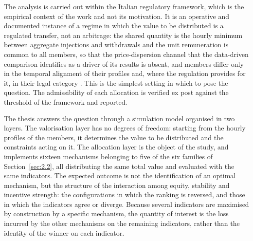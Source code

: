 The analysis is carried out within the Italian regulatory framework, which is the empirical context of the work and not its motivation. It is an operative and documented instance of a regime in which the value to be distributed is a regulated transfer, not an arbitrage: the shared quantity is the hourly minimum between aggregate injections and withdrawals and the unit remuneration is common to all members, so that the price-dispersion channel that the data-driven comparison identifies as a driver of its results is absent, and members differ only in the temporal alignment of their profiles and, where the regulation provides for it, in their legal category \cite{MASE:Decreto:CER:2023, GSE:CACER:RegoleOperative:2025}. This is the simplest setting in which to pose the question. The admissibility of each allocation is verified ex post against the threshold of the framework and reported.

The thesis answers the question through a simulation model organised in two layers. The valorisation layer has no degrees of freedom: starting from the hourly profiles of the members, it determines the value to be distributed and the constraints acting on it. The allocation layer is the object of the study, and implements sixteen mechanisms belonging to five of the six families of Section~\ref{sec:2.2}, all distributing the same total value and evaluated with the same indicators. The expected outcome is not the identification of an optimal mechanism, but the structure of the interaction among equity, stability and incentive strength: the configurations in which the ranking is reversed, and those in which the indicators agree or diverge. Because several indicators are maximised by construction by a specific mechanism, the quantity of interest is the loss incurred by the other mechanisms on the remaining indicators, rather than the identity of the winner on each indicator.
